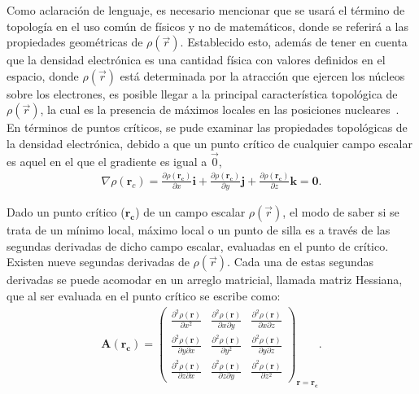 Como aclaración de lenguaje, es necesario mencionar que se usará el término de
topología en el uso común de físicos y no de matemáticos, donde se referirá a
las propiedades geométricas de $\rho(\vec{r})$. Establecido esto, además de
tener en cuenta que la densidad electrónica es una cantidad física con valores
definidos en el espacio, donde $\rho(\vec{r})$ está determinada por la
atracción que ejercen los núcleos sobre los electrones, es posible llegar a la
principal característica topológica de $\rho(\vec{r})$, la cual es la presencia
de máximos locales en las posiciones nucleares~\cite{bader,coppens,matta}.  En
términos de puntos críticos, se pude examinar las propiedades topológicas de la
densidad electrónica, debido a que un punto crítico de cualquier campo escalar
es aquel en el que el gradiente es igual a $\vec{0}$,
\begin{align}
  \nabla\rho(\mathbf{r}_{c})= \frac{\partial\rho(\mathbf{r_{c}})}{\partial x}\mathbf{i} +
  \frac{\partial\rho(\mathbf{r_{c}})}{\partial y}\mathbf{j} +
  \frac{\partial\rho(\mathbf{r_{c}})}{\partial z}\mathbf{k} = \mathbf{0} .
\end{align}

Dado un punto crítico ($\mathbf{r_{c}}$) de un campo escalar $\rho(\vec{r})$,
el modo de saber si se trata de un mínimo local, máximo local o un punto de
silla es a través de las segundas derivadas de dicho campo escalar, evaluadas
en el punto de crítico. Existen nueve segundas derivadas de $\rho(\vec{r})$.
Cada una de estas segundas derivadas se puede acomodar en un arreglo matricial,
llamada matriz Hessiana, que al ser evaluada en el punto crítico se escribe
como:
\begin{align}
  \mathbf{A(r_{c})} =
  \begin{pmatrix}
    \frac{\partial^2\rho(\mathbf{r})}{\partial x^2} & \frac{\partial^2\rho(\mathbf{r})}{\partial x\partial y} & \frac{\partial^2\rho(\mathbf{r})}{\partial x\partial z}\\
    \frac{\partial^2\rho(\mathbf{r})}{\partial y\partial x} & \frac{\partial^2\rho(\mathbf{r})}{\partial y^2} & \frac{\partial^2\rho(\mathbf{r})}{\partial y\partial z}\\
    \frac{\partial^2\rho(\mathbf{r})}{\partial z\partial x} & \frac{\partial^2\rho(\mathbf{r})}{\partial z\partial y} & \frac{\partial^2\rho(\mathbf{r})}{\partial z^2}
 \end{pmatrix}_{\mathbf{r=r_{c}}} .
\end{align}

